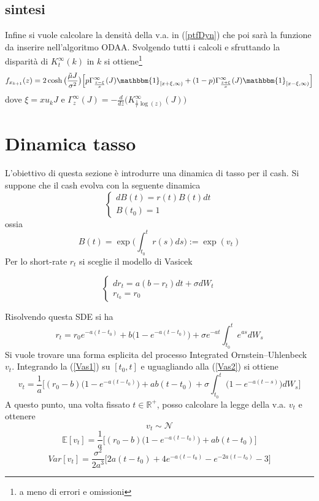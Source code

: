 \documentclass[12pt]{article}
\theoremstyle{break}
\begin{document}
\subsection{sintesi}
Infine si vuole calcolare la densità della v.a. in (\ref{ptfDyn}) che poi sarà la funzione da inserire nell'algoritmo ODAA. Svolgendo tutti i calcoli e sfruttando la disparità di $K_t^\infty(k)$ in $k$ si ottiene\footnote{a meno di errori e omissioni}
\begin{equation}
f_{x_{k+1}}(z) = 2\cosh\big(\frac{\tilde{\mu}J}{\sigma^2}\big)\Big[p \Gamma^\infty_{\frac{z-\xi}{x}}(J) \mathbbm{1}_{[x+\xi,\infty)} + (1-p)\Gamma^\infty_{\frac{z+\xi}{x}}(J) \mathbbm{1}_{[x-\xi,\infty)}  \Big]
\end{equation}
dove $\xi = x u_k J$ e $\Gamma^\infty_{z}(J) = -\frac{d}{dz}\Big(K^\infty_{\frac{1}{r}\log(z)}(J)\Big)$

\section{Dinamica tasso}
L'obiettivo di questa sezione è introdurre una dinamica di tasso per il cash. Si suppone che il cash evolva con la seguente dinamica 
\[
\begin{cases}
dB(t) = r(t)B(t)dt \\  
B(t_0) = 1
\end{cases}
\]
ossia \[ B(t) = \exp\Big(\int_{t_0}^{t}r(s)ds\Big) := \exp(v_t)\] Per lo short-rate $r_t$ si sceglie il modello di Vasicek

\begin{equation}\label{Vas1}
\begin{cases}
dr_t = a(b - r_t)dt + \sigma dW_t\\
r_{t_0} = r_0
\end{cases}
\end{equation}

Risolvendo questa SDE si ha
\begin{equation}\label{Vas2}
r_t = r_0e^{-a(t-t_0)} + b \big(1-e^{-a(t-t_0)}\big)+\sigma e^{-a t}\int_{t_0}^{t}e^{as}dW_s
\end{equation}
Si vuole trovare una forma esplicita del processo Integrated Ornstein–Uhlenbeck $v_t$. Integrando la (\ref{Vas1}) su $[t_0,t]$ e uguagliando alla (\ref{Vas2}) si ottiene 
\begin{equation}
	\boxed{v_t = \frac{1}{a}\Big[(r_0 - b)\big(1-e^{-a(t-t_0)}\big)+ab(t-t_0)+\sigma\int_{t_0}^{t}\big(1-e^{-a(t-s)}\big)dW_s  \Big]}
\end{equation}
A questo punto, una volta fissato $t \in \mathbb{R}^+$, posso calcolare la legge della v.a. $v_t$ e ottenere
\[
v_t \sim \mathcal{N}
\]
\[
\mathbb{E}[v_t] = \frac{1}{a}\Big[(r_0 - b)\big(1-e^{-a(t-t_0)}\big)+ab(t-t_0)\Big]
\]
\[
Var[v_t] = \frac{\sigma^2}{2a^3}\Big[2a(t-t_0) + 4e^{-a(t-t_0)}-e^{-2a(t-t_0)}-3\Big]
\]
\end{document}
